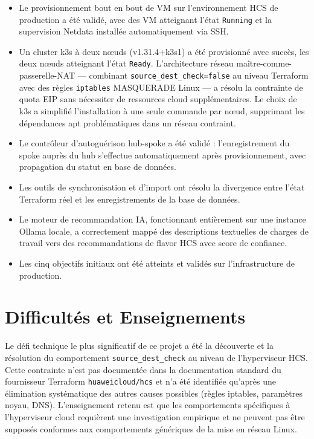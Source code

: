 \begin{itemize}
  \item Le provisionnement bout en bout de VM sur l'environnement HCS de production
        a été validé, avec des VM atteignant l'état \texttt{Running} et la supervision
        Netdata installée automatiquement via SSH.
  \item Un cluster k3s à deux nœuds (v1.31.4+k3s1) a été provisionné avec succès,
        les deux nœuds atteignant l'état \texttt{Ready}. L'architecture réseau
        maître-comme-passerelle-NAT --- combinant \texttt{source\_dest\_check=false}
        au niveau Terraform avec des règles \texttt{iptables} MASQUERADE Linux ---
        a résolu la contrainte de quota EIP sans nécessiter de ressources cloud
        supplémentaires. Le choix de k3s a simplifié l'installation à une seule
        commande par nœud, supprimant les dépendances apt problématiques dans un
        réseau contraint.
  \item Le contrôleur d'autoguérison hub-spoke a été validé : l'enregistrement du
        spoke auprès du hub s'effectue automatiquement après provisionnement, avec
        propagation du statut en base de données.
  \item Les outils de synchronisation et d'import ont résolu la divergence entre
        l'état Terraform réel et les enregistrements de la base de données.
  \item Le moteur de recommandation IA, fonctionnant entièrement sur une instance
        Ollama locale, a correctement mappé des descriptions textuelles de charges de
        travail vers des recommandations de flavor HCS avec score de confiance.
  \item Les cinq objectifs initiaux ont été atteints et validés sur l'infrastructure
        de production.
\end{itemize}

\section*{Difficultés et Enseignements}

Le défi technique le plus significatif de ce projet a été la découverte et la
résolution du comportement \texttt{source\_dest\_check} au niveau de l'hyperviseur
HCS. Cette contrainte n'est pas documentée dans la documentation standard du fournisseur
Terraform \texttt{huaweicloud/hcs} et n'a été identifiée qu'après une élimination
systématique des autres causes possibles (règles iptables, paramètres noyau, DNS).
L'enseignement retenu est que les comportements spécifiques à l'hyperviseur cloud
requièrent une investigation empirique et ne peuvent pas être supposés conformes aux
comportements génériques de la mise en réseau Linux.

